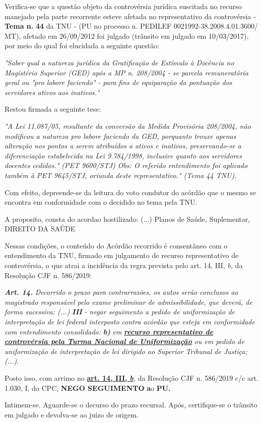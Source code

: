 \documentclass[12pt]{article}
\begin{document}
\justifying
\noindent Verifica-se que a questão objeto da controvérsia jurídica suscitada no recurso manejado pela parte recorrente esteve afetada no representativo da controvérsia - \textbf{Tema n. }\textbf{44} da TNU - (PU no processo n. PEDILEF 0021992-38.2008.4.01.3600/ MT),  afetado em 26/09/2012 foi julgado (trânsito em julgado em 10/03/2017), por meio do qual foi elucidada a seguinte questão:

\noindent \textit{"Saber qual a natureza jurídica da Gratificação de Estímulo à Docência no Magistério Superior (GED) após a MP n. 208/2004 - se parcela remuneratória geral ou "pro labore faciendo" - para fins de equiparação da pontuação dos servidores ativos aos inativos."}

\noindent Restou firmada a seguinte tese:

\noindent \textit{"A Lei 11.087/05, resultante da conversão da Medida Provisória 208/2004, não modificou a natureza pro labore faciendo da GED, porquanto trouxe apenas alteração nos pontos a serem atribuídos a ativos e inativos, preservando-se a diferenciação estabelecida na Lei 9.784/1998, inclusive quanto aos servidores docentes cedidos." (PET 9600/STJ) Obs: O referido entendimento foi aplicado também à PET 9645/STJ, oriunda deste representativo." (Tema 44 TNU).}

\noindent Com efeito, depreende-se da leitura do voto condutor do acórdão que o mesmo se encontra em conformidade com o decidido no  tema pela TNU.

\noindent A proposito, consta do acordao hostilizado: (...) Planos de Saúde, Suplementar, DIREITO DA SAÚDE

\noindent Nessas condições, o conteúdo do Acórdão recorrido é consentâneo com o entendimento da TNU, firmado em julgamento de recurso representativo de controvérsia, o que atrai a incidência da regra prevista pelo art. 14, III, \textit{b,} da Resolução CJF n. 586/2019:

\noindent \textit{\textbf{Art. 14.}}\textit{ Decorrido o prazo para contrarrazões, os autos serão conclusos ao magistrado responsável pelo exame preliminar de admissibilidade, que deverá, de forma sucessiva: (...) }\textit{\textbf{III }}\textit{- negar seguimento a pedido de uniformização de interpretação de lei federal interposto contra acórdão que esteja em conformidade com entendimento consolidado: }\textit{\textbf{b)}}\textit{ em }\uline{\textit{\textbf{recurso representativo de controvérsia pela Turma Nacional de Uniformização}}}\textit{ ou em pedido de uniformização de interpretação de lei dirigido ao Superior Tribunal de Justiça;(...).}

\noindent Posto isso, com arrimo no \uline{\textbf{art. 14, III, }}\uline{\textit{\textbf{b}}}\textit{,} da Resolução CJF n. 586/2019 c/c art. 1.030, I, do CPC, \textbf{NEGO SEGUIMENTO }\textbf{a}o\textbf{ PU}\textbf{.}

\noindent Intimem-se. Aguarde-se o decurso do prazo recursal. Após, certifique-se o trânsito em julgado e devolva-se ao juízo de origem.
\end{document}
